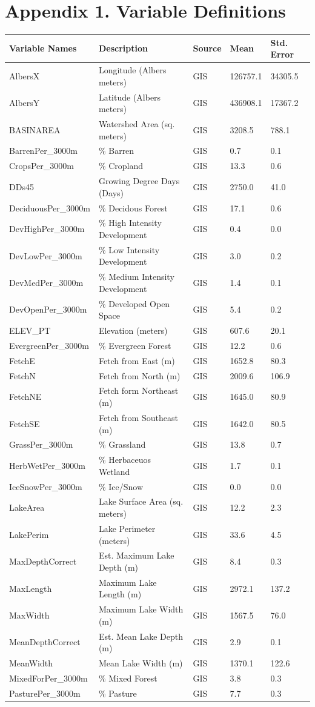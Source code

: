\documentclass[12pt,]{article}
\begin{document}
\newpage

\section{Appendix 1. Variable
Definitions}\label{appendix-1.-variable-definitions}

\begin{longtable}[c]{@{}lllll@{}}
\toprule
Variable Names & Description & Source & Mean & Std. Error\tabularnewline
\midrule
\endhead
AlbersX & Longitude (Albers meters) & GIS & 126757.1 &
34305.5\tabularnewline
AlbersY & Latitude (Albers meters) & GIS & 436908.1 &
17367.2\tabularnewline
BASINAREA & Watershed Area (sq. meters) & GIS & 3208.5 &
788.1\tabularnewline
BarrenPer\_3000m & \% Barren & GIS & 0.7 & 0.1\tabularnewline
CropsPer\_3000m & \% Cropland & GIS & 13.3 & 0.6\tabularnewline
DDs45 & Growing Degree Days (Days) & GIS & 2750.0 & 41.0\tabularnewline
DeciduousPer\_3000m & \% Decidous Forest & GIS & 17.1 &
0.6\tabularnewline
DevHighPer\_3000m & \% High Intensity Development & GIS & 0.4 &
0.0\tabularnewline
DevLowPer\_3000m & \% Low Intensity Development & GIS & 3.0 &
0.2\tabularnewline
DevMedPer\_3000m & \% Medium Intensity Development & GIS & 1.4 &
0.1\tabularnewline
DevOpenPer\_3000m & \% Developed Open Space & GIS & 5.4 &
0.2\tabularnewline
ELEV\_PT & Elevation (meters) & GIS & 607.6 & 20.1\tabularnewline
EvergreenPer\_3000m & \% Evergreen Forest & GIS & 12.2 &
0.6\tabularnewline
FetchE & Fetch from East (m) & GIS & 1652.8 & 80.3\tabularnewline
FetchN & Fetch from North (m) & GIS & 2009.6 & 106.9\tabularnewline
FetchNE & Fetch form Northeast (m) & GIS & 1645.0 & 80.9\tabularnewline
FetchSE & Fetch from Southeast (m) & GIS & 1642.0 & 80.5\tabularnewline
GrassPer\_3000m & \% Grassland & GIS & 13.8 & 0.7\tabularnewline
HerbWetPer\_3000m & \% Herbaceuos Wetland & GIS & 1.7 &
0.1\tabularnewline
IceSnowPer\_3000m & \% Ice/Snow & GIS & 0.0 & 0.0\tabularnewline
LakeArea & Lake Surface Area (sq. meters) & GIS & 12.2 &
2.3\tabularnewline
LakePerim & Lake Perimeter (meters) & GIS & 33.6 & 4.5\tabularnewline
MaxDepthCorrect & Est. Maximum Lake Depth (m) & GIS & 8.4 &
0.3\tabularnewline
MaxLength & Maximum Lake Length (m) & GIS & 2972.1 &
137.2\tabularnewline
MaxWidth & Maximum Lake Width (m) & GIS & 1567.5 & 76.0\tabularnewline
MeanDepthCorrect & Est. Mean Lake Depth (m) & GIS & 2.9 &
0.1\tabularnewline
MeanWidth & Mean Lake Width (m) & GIS & 1370.1 & 122.6\tabularnewline
MixedForPer\_3000m & \% Mixed Forest & GIS & 3.8 & 0.3\tabularnewline
PasturePer\_3000m & \% Pasture & GIS & 7.7 & 0.3\tabularnewline

\end{longtable}
\end{document}
